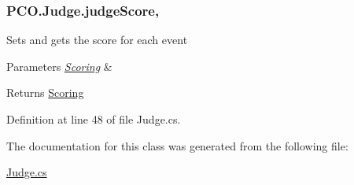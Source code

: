 \hypertarget{classPCO_1_1Judge_a76d950e6f90615fe320c12db369da4c4}{
\subsubsection[{judge\+Score}]{ P\+C\+O.\+Judge.\+judge\+Score\hspace{0.3cm}{\ttfamily [get]}, {\ttfamily [set]}}}\label{classPCO_1_1Judge_a76d950e6f90615fe320c12db369da4c4}
Sets and gets the score for each event 
\begin{DoxyParams}{Parameters}
{\em \hyperlink{classPCO_1_1Scoring}{Scoring}} & \\
\hline
\end{DoxyParams}
\begin{DoxyReturn}{Returns}
\hyperlink{classPCO_1_1Scoring}{Scoring} 
\end{DoxyReturn}


Definition at line 48 of file Judge.\+cs.



The documentation for this class was generated from the following file\+:\begin{DoxyCompactItemize}
\item 
\hyperlink{Judge_8cs}{Judge.\+cs}\end{DoxyCompactItemize}
